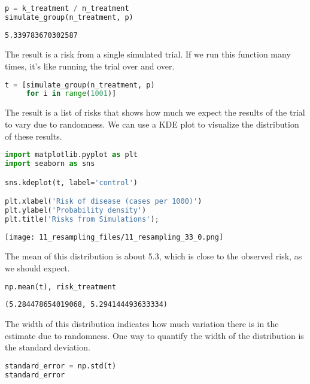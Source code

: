 \begin{lstlisting}[language=Python,style=source]
p = k_treatment / n_treatment
simulate_group(n_treatment, p)
\end{lstlisting}

\begin{lstlisting}[style=output]
5.339783670302587
\end{lstlisting}

The result is a risk from a single simulated trial. If we run this
function many times, it's like running the trial over and over.

\begin{lstlisting}[language=Python,style=source]
t = [simulate_group(n_treatment, p)
     for i in range(1001)]
\end{lstlisting}

The result is a list of risks that shows how much we expect the results
of the trial to vary due to randomness. We can use a KDE plot to
visualize the distribution of these results.

\begin{lstlisting}[language=Python,style=source]
import matplotlib.pyplot as plt
import seaborn as sns

sns.kdeplot(t, label='control')

plt.xlabel('Risk of disease (cases per 1000)')
plt.ylabel('Probability density')
plt.title('Risks from Simulations');
\end{lstlisting}

\begin{center}
\texttt{[image: 11\_resampling\_files/11\_resampling\_33\_0.png]}
\end{center}

The mean of this distribution is about 5.3, which is close to the
observed risk, as we should expect.

\begin{lstlisting}[language=Python,style=source]
np.mean(t), risk_treatment
\end{lstlisting}

\begin{lstlisting}[style=output]
(5.284478654019068, 5.294144493633334)
\end{lstlisting}

The width of this distribution indicates how much variation there is in
the estimate due to randomness. One way to quantify the width of the
distribution is the standard deviation.

\begin{lstlisting}[language=Python,style=source]
standard_error = np.std(t)
standard_error
\end{lstlisting}


